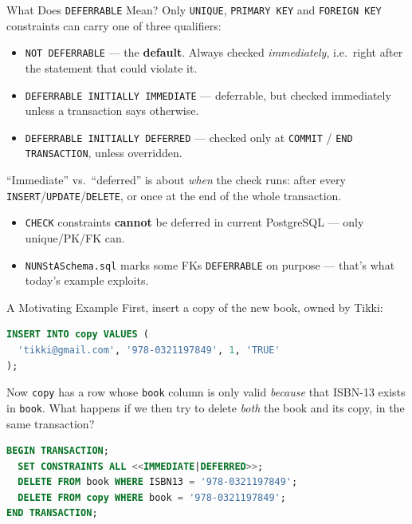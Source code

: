 \documentclass{beamer}
\begin{document}
\begin{frame}{What Does \texttt{DEFERRABLE} Mean?}
\small
Only \texttt{UNIQUE}, \texttt{PRIMARY KEY} and \texttt{FOREIGN KEY} constraints can carry one of three qualifiers:
\begin{itemize}
  \item \texttt{NOT DEFERRABLE} --- the \textbf{default}. Always checked \emph{immediately}, i.e.\ right after the statement that could violate it.
  \item \texttt{DEFERRABLE INITIALLY IMMEDIATE} --- deferrable, but checked immediately unless a transaction says otherwise.
  \item \texttt{DEFERRABLE INITIALLY DEFERRED} --- checked only at \texttt{COMMIT} / \texttt{END TRANSACTION}, unless overridden.
\end{itemize}
\medskip
``Immediate'' vs.\ ``deferred'' is about \emph{when} the check runs: after every \texttt{INSERT}/\texttt{UPDATE}/\texttt{DELETE}, or once at the end of the whole transaction.
\begin{itemize}
  \item \texttt{CHECK} constraints \textbf{cannot} be deferred in current PostgreSQL --- only unique/PK/FK can.
  \item \texttt{NUNStASchema.sql} marks some FKs \texttt{DEFERRABLE} on purpose --- that's what today's example exploits.
\end{itemize}
\end{frame}

\begin{frame}[fragile]{A Motivating Example}
\small
First, insert a copy of the new book, owned by Tikki:
\begin{lstlisting}[language=SQL]
INSERT INTO copy VALUES (
  'tikki@gmail.com', '978-0321197849', 1, 'TRUE'
);
\end{lstlisting}
Now \texttt{copy} has a row whose \texttt{book} column is only valid \emph{because} that ISBN-13 exists in \texttt{book}. What happens if we then try to delete \emph{both} the book and its copy, in the same transaction?
\begin{lstlisting}[language=SQL]
BEGIN TRANSACTION;
  SET CONSTRAINTS ALL <<IMMEDIATE|DEFERRED>>;
  DELETE FROM book WHERE ISBN13 = '978-0321197849';
  DELETE FROM copy WHERE book = '978-0321197849';
END TRANSACTION;
\end{lstlisting}
\end{frame}
\end{document}
